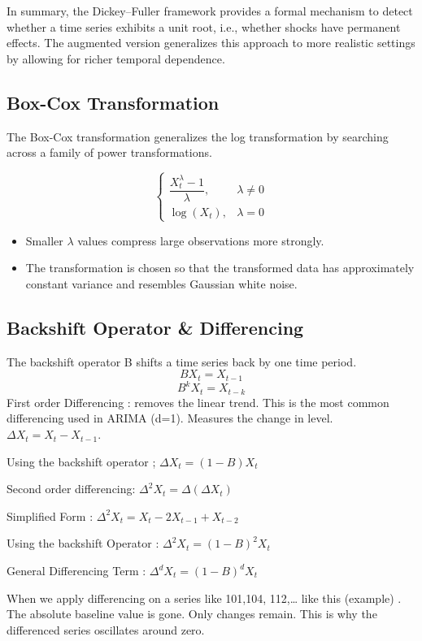\documentclass[10pt,a4paper]{article}
\begin{document}
	In summary, the Dickey--Fuller framework provides a formal mechanism to detect whether a time series exhibits a unit root, i.e., whether shocks have permanent effects. The augmented version generalizes this approach to more realistic settings by allowing for richer temporal dependence.
	
	
	
	\subsection{Box-Cox Transformation}
	
	The Box-Cox transformation generalizes the log transformation by searching across a family of power transformations.
	
	
	\[
	\begin{cases}
	\dfrac{X_t^{\lambda} - 1}{\lambda}, & \lambda \neq 0 \\
	\log(X_t), & \lambda = 0
	\end{cases}
	\]
	
	\begin{itemize}
	\item Smaller $\lambda$ values compress large observations more strongly.
	\item The transformation is chosen so that the transformed data has approximately constant variance and resembles Gaussian white noise.
	\end{itemize}
	
	
	\subsection{Backshift Operator \& Differencing}
	The backshift operator B shifts a time series back by one time period. 
	$$
	B X_t = X_{t-1}
	$$
	$$
	B^k X_t = X_{t-k}
	$$
	First order Differencing : removes the linear trend. This is the most common differencing used in ARIMA (d=1). Measures the change in level. $\Delta X_t = X_t - X_{t-1}$. 
	
	Using the backshift operator ; $\Delta X_t = (1 - B) X_t$
	
	Second order differencing: $\Delta^2 X_t = \Delta(\Delta X_t)$
	
	Simplified Form : $\Delta^2 X_t = X_t - 2X_{t-1} + X_{t-2}$
	
	Using the backshift Operator : $\Delta^2 X_t = (1 - B)^2 X_t$
	
	General Differencing Term : $\Delta^d X_t = (1 - B)^d X_t$
	
	When we apply differencing on a series like 101,104, 112,… like this (example) . The absolute baseline value is gone. Only changes remain. This is why the differenced series oscillates around zero. 
	
\end{document}
